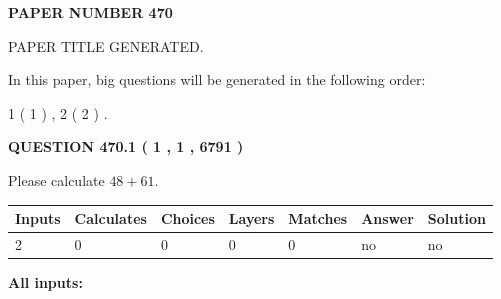 \documentclass[12pt]{article}
\begin{document}
   
   
   
\newpage 
\setcounter{page}{ 
   470001 } 
   
   
   
   
 {\textbf{ \Large{ PAPER NUMBER  470  }}}
   
   
\vspace{0.2in}
   
   
   
   
   
   
   
   
 \vspace{0.2in}
 
 
 
 
   
   
 PAPER TITLE GENERATED.
   
   
   
\vspace{0.2in}
   
In this paper, big questions will be generated in the following order: 
   
   
   1 ( 1 )
 ,
   2 ( 2 )
 .
  
\vspace{0.2in}
  
{\textbf{\Large{QUESTION
470.1 
 ( 1 , 1 , 6791 )
}}}
  
  
 
Please calculate $ %
48 +  %
61 $.
 
 
   
   
   
   
\noindent\begin{tabular}{|l|l|l|l|l|l|l|}
 \hline
Inputs & Calculates & Choices & Layers & Matches & Answer & Solution \\ \hline
 2  & 
 0  & 
 0
  & 
 0  & 
 0  & 
  no & 
  no 
  \\ \hline
 \end{tabular}
   
   
   
   
\noindent{}
   
   
   
   
\noindent\vspace{0.1in}\hspace{-0.08in} {\textbf{\Large{All inputs: }}}
   
   
  
\end{document}
